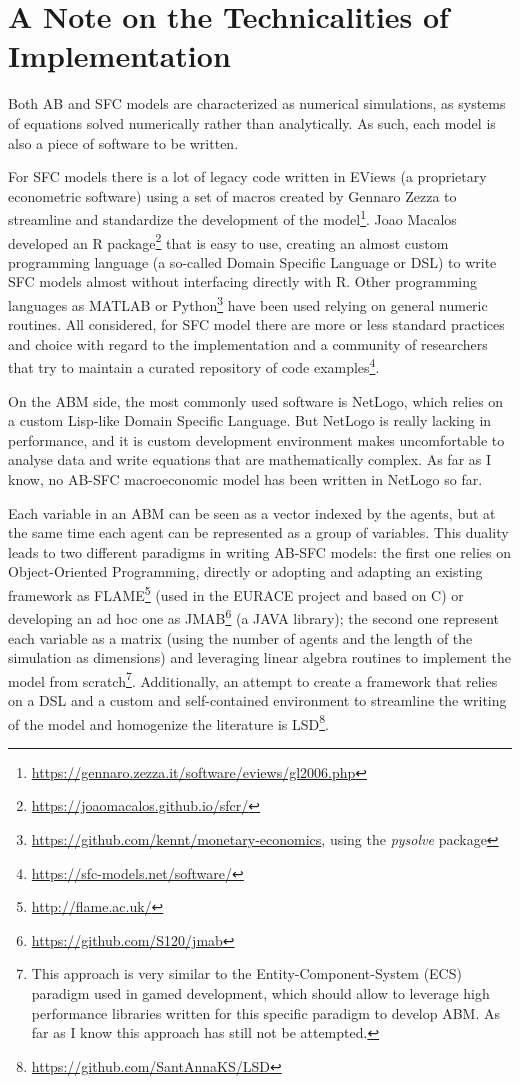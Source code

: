 \chapter{A Note on the Technicalities of Implementation}
\label{ch:implementation}
Both AB and SFC models are characterized as numerical simulations, as systems of equations solved numerically rather than analytically.
As such, each model is also a piece of software to be written.

For SFC models there is a lot of legacy code written in EViews (a proprietary econometric software) using a set of macros created by Gennaro Zezza to streamline and standardize the development of the model\footnote{\url{https://gennaro.zezza.it/software/eviews/gl2006.php}}.
Joao Macalos developed an R package\footnote{\url{https://joaomacalos.github.io/sfcr/}} that is easy to use, creating an almost custom programming language (a so-called Domain Specific Language or DSL) to write SFC models almost without interfacing directly with R.
Other programming languages as MATLAB or Python\footnote{\url{https://github.com/kennt/monetary-economics}, using the \textit{pysolve} package} have been used relying on general numeric routines.
All considered, for SFC model there are more or less standard practices and choice with regard to the implementation and a community of researchers that try to maintain a curated repository of code examples\footnote{\url{https://sfc-models.net/software/}}.

On the ABM side, the most commonly used software is NetLogo, which relies on a custom Lisp-like Domain Specific Language. But NetLogo is really lacking in performance, and it is custom development environment makes uncomfortable to analyse data and write equations that are mathematically complex. As far as I know, no AB-SFC macroeconomic model has been written in NetLogo so far.

Each variable in an ABM can be seen as a vector indexed by the agents, but at the same time each agent can be represented as a group of variables.
This duality leads to two different paradigms in writing AB-SFC models: the first one relies on Object-Oriented Programming, directly or adopting and adapting an existing framework as FLAME\footnote{\url{http://flame.ac.uk/}} (used in the EURACE project and based on C) or developing an ad hoc one as JMAB\footnote{\url{https://github.com/S120/jmab}} (a JAVA library); the second one represent each variable as a matrix (using the number of agents and the length of the simulation as dimensions) and leveraging linear algebra routines to implement the model from scratch\footnote{This approach is very similar to the Entity-Component-System (ECS) paradigm used in gamed development, which should allow to leverage high performance libraries written for this specific paradigm to develop ABM. As far as I know this approach has still not be attempted.}.
Additionally, an attempt to create a framework that relies on a DSL and a custom and self-contained environment to streamline the writing of the model and homogenize the literature is LSD\footnote{\url{https://github.com/SantAnnaKS/LSD}}.

